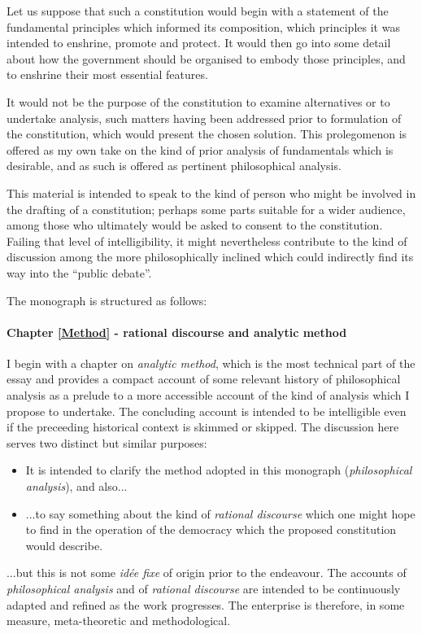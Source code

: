 \documentclass[10pt,titlepage]{book}
\begin{document}
Let us suppose that such a constitution would begin with a statement of the fundamental principles which informed its composition, which principles it was intended to enshrine, promote and protect.
It would then go into some detail about how the government should be organised to embody those principles, and to enshrine their most essential features.

It would not be the purpose of the constitution to examine alternatives or to undertake analysis, such matters having been addressed prior to formulation of the constitution, which would present the chosen solution.
This prolegomenon is offered as my own take on the kind of prior analysis of fundamentals which is desirable, and as such is offered as pertinent philosophical analysis.

This material is intended to speak to the kind of person who might be involved in the drafting of a constitution; perhaps some parts suitable for a wider audience, among those who ultimately would be asked to consent to the constitution.
Failing that level of intelligibility, it might nevertheless contribute to the kind of discussion among the more philosophically inclined which could indirectly find its way into the ``public debate''.

The monograph is structured as follows:

\paragraph{Chapter \ref{Method} - rational discourse and analytic method}
I begin with a chapter on \emph{analytic method}, which is the most technical part of the essay and provides a compact account of some relevant history of philosophical analysis as a prelude to a more accessible account of the kind of analysis which I propose to undertake.
The concluding account is intended to be intelligible even if the preceeding historical context is skimmed or skipped.
The discussion here serves two distinct but similar purposes:
\begin{itemize}
\item
  It is intended to clarify the method adopted in this monograph ({\it philosophical analysis}), and also...
\item
  ...to say something about the kind of {\it rational discourse} which one might hope to find in the operation of the democracy which the proposed constitution would describe.
\end{itemize}
...but this is not some {\it idée fixe} of origin prior to the endeavour.
The accounts of {\it philosophical analysis} and of {\it rational discourse} are intended to be continuously adapted and refined as the work progresses.
The enterprise is therefore, in some measure, meta-theoretic and methodological.
\end{document}
